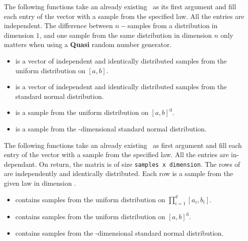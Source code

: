 The following functions take an already existing \ptr\  as
its first argument and fill each entry of the vector with a sample from the
specified law. All the entries are independent. The difference between
$n-$samples from a distribution in dimension $1$, and one sample from the same
distribution in dimension $n$ only matters when using a {\bf Quasi} random
number generator.
\begin{itemize}
\item {}
  \sshortdescribe {} is a vector of independent and identically distributed
  samples from the uniform distribution on $[a, b]$.

\item {}
  \sshortdescribe {} is a vector of independent and identically distributed
  samples from the standard normal distribution.

\item {}
  \sshortdescribe {} is a sample from the uniform distribution on $[a,
  b]^{\text{d}}$.

\item {}
  \sshortdescribe {} is a sample from the -dimensional
  standard normal distribution.

\end{itemize}

The following functions take an already existing \ptr\  as
first argument and fill each entry of the vector with a sample from the
specified law. All the entries are in-dependant. On return, the matrix 
is of size \verb!samples x dimension!. The rows of  are independently
and identically distributed. Each row is a sample from the given law in
dimension .
\begin{itemize}
\item {}
  \sshortdescribe {} contains  samples from the uniform
  distribution on $\prod_{i=1}^d [a_i, b_i]$.

\item {}
  \sshortdescribe {} contains  samples from the uniform
  distribution on $[a, b]^{\text{d}}$.

\item {}
  \sshortdescribe {} contains  samples from the
  -dimensional standard normal distribution.
\end{itemize}

